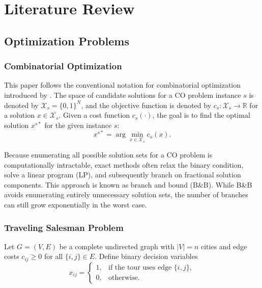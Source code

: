 \chapter{Literature Review}
\label{ch:Literature Review}

\section{Optimization Problems}
\label{sec:optimization-problems}

\subsection{Combinatorial Optimization}
\label{subsec:combinatorial-optimization}

This paper follows the conventional notation for combinatorial optimization introduced by
\citet{papadimitriou1998combinatorial}. The space of candidate solutions for a CO problem
instance $s$ is denoted by $\mathcal{X}_s = \{0, 1\}^N$, and the objective function is denoted
by $c_s: \mathcal{X}_s \rightarrow \mathbb{R}$ for a solution $x \in \mathcal{X}_s$.
Given a cost function $c_s(\cdot)$, the goal is to find the optimal solution $x^{s*}$ for
the given instance $s$:
\[
x^{s*} = \arg\min_{x \in \mathcal{X}_s} c_s(x).
\]

Because enumerating all possible solution sets for a CO problem is computationally
intractable, exact methods often relax the binary condition, solve a linear program (LP), and
subsequently branch on fractional solution components. This approach is known as branch and
bound (B\&B). While B\&B avoids enumerating entirely unnecessary solution sets, the number of
branches can still grow exponentially in the worst case.

\subsection{Traveling Salesman Problem}
\label{subsec:tsp}

Let $G = (V, E)$ be a complete undirected graph with $|V| = n$ cities and edge costs
$c_{ij} \ge 0$ for all $\{i,j\} \in E$. Define binary decision variables
\[
x_{ij} =
\begin{cases}
1, & \text{if the tour uses edge } \{i,j\},\\
0, & \text{otherwise.}
\end{cases}
\]

